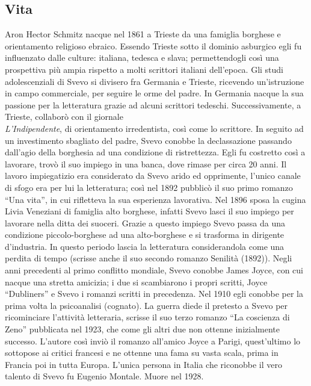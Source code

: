 \documentclass[10pt]{report}
\begin{document}
		\subsection{Vita}
		Aron Hector Schmitz nacque nel 1861 a Trieste da una famiglia borghese e orientamento religioso ebraico. Essendo Trieste sotto il dominio asburgico egli fu influenzato dalle culture: italiana, tedesca e slava; permettendogli così una prospettiva più ampia rispetto a molti scrittori italiani dell’epoca. Gli studi adolescenziali di Svevo si divisero fra Germania e Trieste, ricevendo un’istruzione in campo commerciale, per seguire le orme del padre. In Germania nacque la sua passione per la letteratura grazie ad alcuni scrittori tedeschi. 
		Successivamente, a Trieste, collaborò con il giornale\\
		 \textit{L’Indipendente}, di orientamento irredentista, così come lo scrittore. In seguito ad un investimento sbagliato del padre, Svevo conobbe la declassazione passando dall’agio della borghesia ad una condizione di ristrettezza. Egli fu costretto così a lavorare, trovò il suo impiego in una banca, dove rimase per circa 20 anni. Il lavoro impiegatizio era considerato da Svevo arido ed opprimente, l’unico canale di sfogo era per lui la letteratura; così nel 1892 pubblicò il suo primo romanzo “Una vita”, in cui rifletteva la sua esperienza lavorativa. Nel 1896 sposa la cugina Livia Veneziani di famiglia alto borghese, infatti Svevo lasci il suo impiego per lavorare nella ditta dei suoceri. Grazie a questo impiego Svevo passa da una condizione piccolo-borghese ad una alto-borghese e si trasforma in dirigente d’industria. In questo periodo lascia la letteratura considerandola come una perdita di tempo (scrisse anche il suo secondo romanzo Senilità (1892)). Negli anni precedenti al primo conflitto mondiale, Svevo conobbe James Joyce, con cui nacque una stretta amicizia; i due si scambiarono i propri scritti, Joyce “Dubliners” e Svevo i romanzi scritti in precedenza. Nel 1910 egli conobbe per la prima volta la psicoanalisi (cognato). La guerra diede il pretesto a Svevo per ricominciare l’attività letteraria, scrisse il suo terzo romanzo “La coscienza di Zeno” pubblicata nel 1923, che come gli altri due non ottenne inizialmente successo. L’autore così inviò il romanzo all’amico Joyce a Parigi, quest’ultimo lo sottopose ai critici francesi e ne ottenne una fama su vasta scala, prima in Francia poi in tutta Europa. L’unica persona in Italia che riconobbe il vero talento di Svevo fu Eugenio Montale. Muore nel 1928.
		
\end{document}
